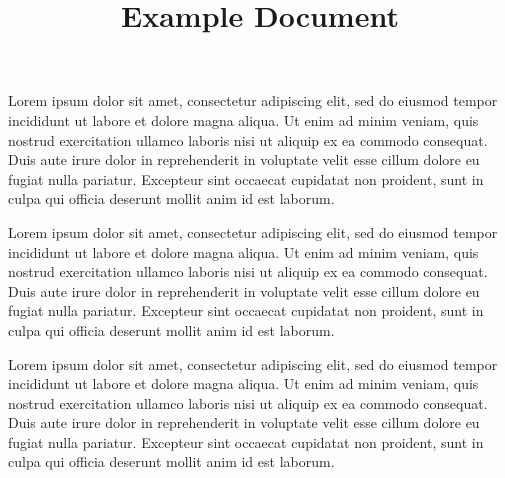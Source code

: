 \documentclass{article}
\title{Example Document}
\begin{document}
Lorem ipsum dolor sit amet, consectetur adipiscing elit, sed do eiusmod tempor incididunt ut 
labore et dolore magna aliqua. Ut enim ad minim veniam, quis nostrud exercitation ullamco laboris 
nisi ut aliquip ex ea commodo consequat. Duis aute irure dolor in reprehenderit in voluptate velit 
esse cillum dolore eu fugiat nulla pariatur. Excepteur sint occaecat cupidatat non proident, sunt 
in culpa qui officia deserunt mollit anim id est laborum.

Lorem ipsum dolor sit amet, consectetur adipiscing elit, sed do eiusmod tempor incididunt ut 
labore et dolore magna aliqua. Ut enim ad minim veniam, quis nostrud exercitation ullamco laboris 
nisi ut aliquip ex ea commodo consequat. Duis aute irure dolor in reprehenderit in voluptate velit 
esse cillum dolore eu fugiat nulla pariatur. Excepteur sint occaecat cupidatat non proident, sunt 
in culpa qui officia deserunt mollit anim id est laborum.

Lorem ipsum dolor sit amet, consectetur adipiscing elit, sed do eiusmod tempor incididunt ut 
labore et dolore magna aliqua. Ut enim ad minim veniam, quis nostrud exercitation ullamco laboris 
nisi ut aliquip ex ea commodo consequat. Duis aute irure dolor in reprehenderit in voluptate velit 
esse cillum dolore eu fugiat nulla pariatur. Excepteur sint occaecat cupidatat non proident, sunt 
in culpa qui officia deserunt mollit anim id est laborum.
\end{document}
